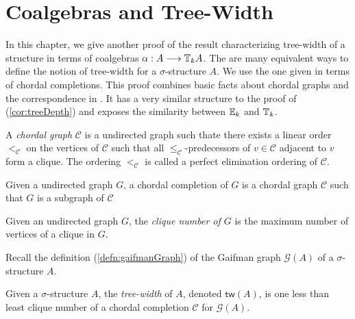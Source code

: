 \section{Coalgebras and Tree-Width}
In this chapter, we give another proof of the result \cite[Theorem 23]{Abramsky2017} characterizing tree-width of a structure in terms of coalgebras $\alpha:A \longrightarrow {\mathbb{T}_{k}A}$. The are many equivalent ways to define the notion of tree-width for a $\sigma$-structure $A$. We use the one given \cite{Parra1997} in terms of chordal completions. This proof combines basic facts about chordal graphs and the correspondence in \cite[Theorem 6]{Abramsky2017}. It has a very similar structure to the proof of (\ref{cor:treeDepth}) and exposes the similarity between ${\mathbb{E}_{k}}$ and ${\mathbb{T}_{k}}$.  
\begin{defn}
A \textit{chordal graph} $\mathcal{C}$ is a undirected graph such thate there exists a linear order $<_{\mathcal{C}}$ on the vertices of $\mathcal{C}$ such that all $\leq_{\mathcal{C}}$-predecessors of $v \in \mathcal{C}$ adjacent to $v$ form a clique. The ordering $<_{\mathcal{C}}$ is called a perfect elimination ordering of $\mathcal{C}$.   
\label{defn:chordalGraph}
\end{defn}
\begin{defn}
Given a undirected graph $G$, a chordal completion of $G$ is a chordal graph $\mathcal{C}$ such that $G$ is a subgraph of $\mathcal{C}$ 
\end{defn}
\begin{defn}
Given an undirected graph $G$, the \textit{clique number of $G$} is the maximum number of vertices of a clique in $G$.
\end{defn}
Recall the definition (\ref{defn:gaifmanGraph}) of the Gaifman graph $\mathcal{G}(A)$ of a $\sigma$-structure $A$.
\begin{defn}
Given a $\sigma$-structure $A$, the \textit{tree-width} of $A$, denoted $\mathsf{tw}(A)$, is one less than least clique number of a chordal completion $\mathcal{C}$ for $\mathcal{G}(A)$. 
\label{defn:treeWidth}
\end{defn}
